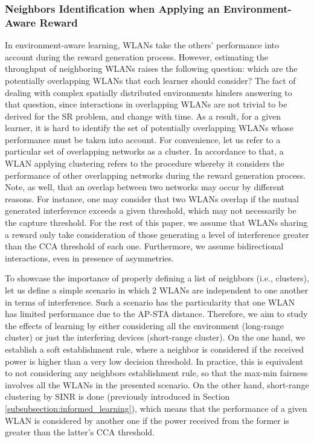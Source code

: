 \documentclass[preprint,12pt]{elsarticle}
\begin{document}
\subsubsection{Neighbors Identification when Applying an Environment-Aware Reward}
\label{subsubsection:clustering}
In environment-aware learning, WLANs take the others' performance into account during the reward generation process. However, estimating the throughput of neighboring WLANs raises the following question: which are the potentially overlapping WLANs that each learner should consider? The fact of dealing with complex spatially distributed environments hinders answering to that question, since interactions in overlapping WLANs are not trivial to be derived for the SR problem, and change with time. As a result, for a given learner, it is hard to identify the set of potentially overlapping WLANs whose performance must be taken into account. For convenience, let us refer to a particular set of overlapping networks as a cluster. In accordance to that, a WLAN applying clustering refers to the procedure whereby it considers the performance of other overlapping networks during the reward generation process. Note, as well, that an overlap between two networks may occur by different reasons. For instance, one may consider that two WLANs overlap if the mutual generated interference exceeds a given threshold, which may not necessarily be the capture threshold. For the rest of this paper, we assume that WLANs sharing a reward only take consideration of those generating a level of interference greater than the CCA threshold of each one. Furthermore, we assume bidirectional interactions, even in presence of asymmetries.

To showcase the importance of properly defining a list of neighbors (i.e., clusters), let us define a simple scenario in which 2 WLANs are independent to one another in terms of interference. Such a scenario has the particularity that one WLAN has limited performance due to the AP-STA distance. Therefore, we aim to study the effects of learning by either considering all the environment (long-range cluster) or just the interfering devices (short-range cluster). On the one hand, we establish a soft establishment rule, where a neighbor is considered if the received power is higher than a very low decision threshold. In practice, this is equivalent to not considering any neighbors establishment rule, so that the max-min fairness involves all the WLANs in the presented scenario. On the other hand, short-range clustering by SINR is done (previously introduced in Section \ref{subsubsection:informed_learning}), which means that the performance of a given WLAN is considered by another one if the power received from the former is greater than the latter's CCA threshold.%
\end{document}
